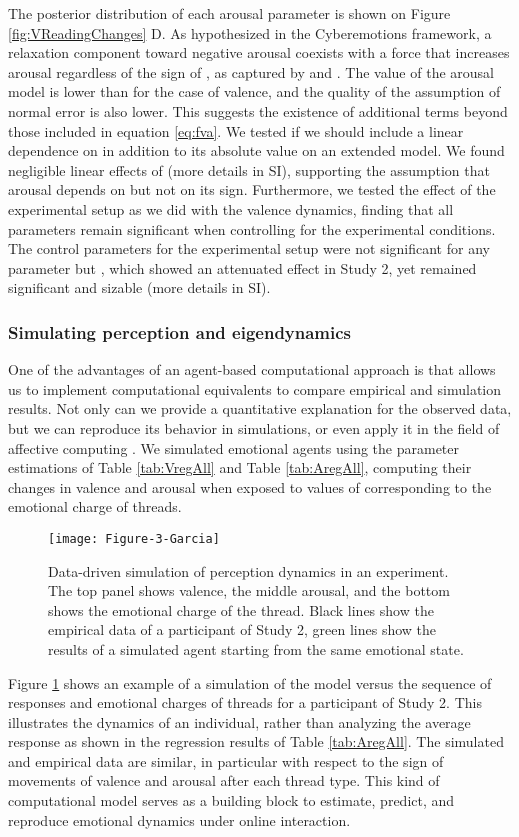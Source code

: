 \documentclass[nologo,url,11pt,a4paper]{ETHpaper}
\begin{document}
The posterior distribution of each arousal parameter is shown on Figure  \ref{fig:VReadingChanges} D.  As hypothesized in the Cyberemotions framework,  a relaxation component toward negative arousal coexists with a force that increases arousal regardless of the sign of , as captured by   and
.  
The  value of the arousal model is lower than for the case of valence, and the quality of the assumption of normal error is also lower.
This suggests the existence of additional terms  beyond those included in equation \ref{eq:fva}.
We tested if we should include a linear dependence on   in addition to its absolute value on an extended model.
We found negligible linear effects of  (more details in SI), supporting the assumption that arousal depends on  but not on its sign.
Furthermore, we tested the effect of the experimental setup as
we did with the valence dynamics, finding that all parameters  remain
significant when controlling for the experimental conditions.  The control
parameters for the experimental setup were not significant for any parameter
but , which showed an attenuated effect in Study 2, yet remained
significant and sizable (more details in SI).

\subsubsection{Simulating perception and eigendynamics}

One of the advantages of an agent-based computational approach is that allows us to
implement computational equivalents to compare empirical and simulation
results. Not only can we provide a quantitative explanation for the observed
data, but we can reproduce its behavior in simulations, or even apply it in
the field of affective computing \cite{Rank2013}.  We simulated emotional
agents using the parameter estimations of Table \ref{tab:VregAll} and Table
\ref{tab:AregAll}, computing their changes in valence and arousal when exposed
to values of  corresponding to the emotional charge of threads. 
\begin{figure}[ht]
\centering
\texttt{[image: Figure-3-Garcia]}
\caption{Data-driven simulation of perception dynamics in an experiment. 
The top panel shows valence, the middle arousal, and the bottom shows the emotional charge of the thread. 
Black lines show the empirical data of a participant of Study 2, green lines show the results of a simulated agent starting from the same emotional state. \label{fig:Simulation} } \end{figure}
Figure \ref{fig:Simulation} shows an example of a simulation of the model
versus the sequence of responses and emotional charges of threads for a
participant of Study 2. 
This illustrates the dynamics of an individual, rather than analyzing the average
response as shown in the regression results of Table \ref{tab:AregAll}.
The simulated and empirical data are similar, in
particular with respect to the sign of movements of valence and arousal after
each thread type. This kind of computational model serves as a building block
to estimate, predict, and reproduce emotional dynamics under online
interaction.
\end{document}
